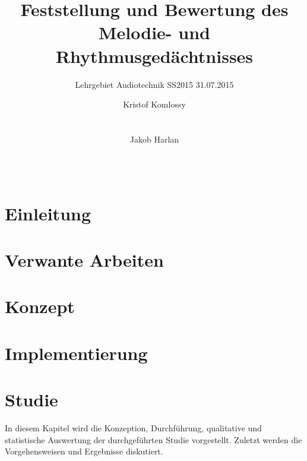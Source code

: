 \documentclass{acm_proc_article-sp}
\begin{document}
\title{Feststellung und Bewertung des Melodie- und Rhythmusgedächtnisses}
\subtitle{Lehrgebiet Audiotechnik SS2015 31.07.2015}

\author{
\alignauthor
Kristof Komlossy\\
       \\
       \\
\alignauthor
Jakob Harlan\\
       \\
       \\
} %

\maketitle

\begin{abstract}

\end{abstract}


\section{Einleitung}

\section{Verwante Arbeiten}

\section{Konzept}
\section{Implementierung}
\section{Studie}
In diesem Kapitel wird die Konzeption, Durchführung, qualitative und statistische Auswertung der durchgeführten Studie vorgestellt. Zuletzt werden die Vorgehensweisen und Ergebnisse diskutiert.
\end{document}
